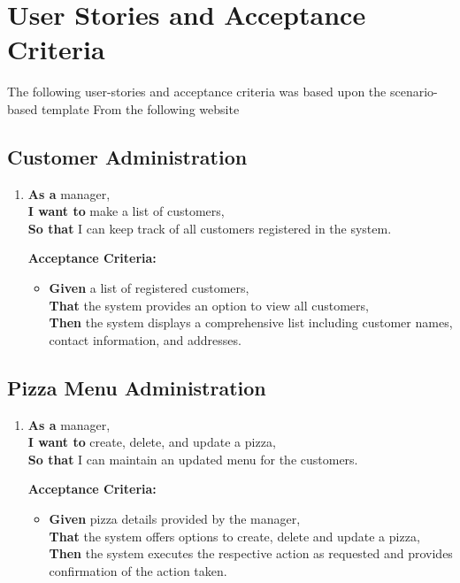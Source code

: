 \section{User Stories and Acceptance Criteria}

 The following user-stories and acceptance criteria was based upon the scenario-based template From the following website\cite{knuthwebsite}




\subsection{Customer Administration}

\begin{enumerate}[label= \textbf{User Story \arabic*:}]
    \item \textbf{As a} manager,\\
    \textbf{I want to} make a list of customers,\\
    \textbf{So that} I can keep track of all customers registered in the system.
    
    \textbf{Acceptance Criteria:}
    \begin{itemize}
        \item \textbf{Given} a list of registered customers,\\
        \textbf{That} the system provides an option to view all customers,\\
        \textbf{Then} the system displays a comprehensive list including customer names, contact information, and addresses.
    \end{itemize}
\end{enumerate}


\subsection{Pizza Menu Administration}

\begin{enumerate}[resume, label= \textbf{User Story \arabic*:}]
    \item \textbf{As a} manager,\\
    \textbf{I want to} create, delete, and update a pizza,\\
    \textbf{So that} I can maintain an updated menu for the customers.
    
    \textbf{Acceptance Criteria:}
    \begin{itemize}
        \item \textbf{Given} pizza details provided by the manager,\\
        \textbf{That} the system offers options to create, delete and update a pizza,\\
        \textbf{Then} the system executes the respective action as requested and provides confirmation of the action taken.
    \end{itemize}
\end{enumerate}

